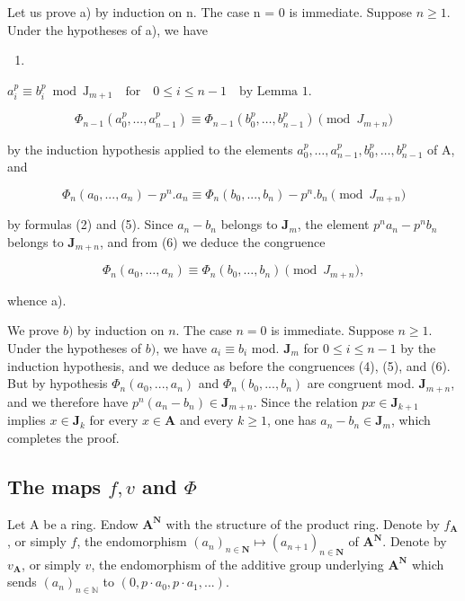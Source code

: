 Let us prove a) by induction on n. The case n = 0 is immediate. Suppose \(n \geqslant 1\). Under the hypotheses of a), we have

\begin{enumerate}
\def\labelenumi{(\arabic{enumi})}
\setcounter{enumi}{3}
\tightlist
\item
\end{enumerate}

\(a_{i}^{p}\equiv b_{i}^{p}\bmod \mathrm{J}_{m + 1}\quad \text{for}\quad 0\leqslant i\leqslant n - 1\quad \text{by Lemma } 1.\)

\[
\Phi_ {n - 1} (a _ {0} ^ {p}, \dots , a _ {n - 1} ^ {p}) \equiv \Phi_ {n - 1} (b _ {0} ^ {p}, \dots , b _ {n - 1} ^ {p}) \pmod{J _ {m + n}}\tag{5}
\]

by the induction hypothesis applied to the elements \(a_0^p, \ldots, a_{n-1}^p, b_0^p, \ldots, b_{n-1}^p\) of A, and

\[
\Phi_ {n} (a _ {0},..., a _ {n}) - p ^ {n}. a _ {n} \equiv \Phi_ {n} (b _ {0},..., b _ {n}) - p ^ {n}. b _ {n} \pmod{J _ {m + n}}\tag{6}
\]

by formulas (2) and (5). Since \(a_{n}-b_{n}\) belongs to \(\mathbf{J}_{m}\), the element \(p^{n}a_{n}-p^{n}b_{n}\) belongs to \(\mathbf{J}_{m+n}\), and from (6) we deduce the congruence

\[
\Phi_ {n} (a _ {0}, \dots , a _ {n}) \equiv \Phi_ {n} (b _ {0}, \dots , b _ {n}) \pmod{J _ {m + n}},
\]

whence a).

We prove \(b)\) by induction on \(n\). The case \(n=0\) is immediate. Suppose \(n\geqslant1\). Under the hypotheses of \(b)\), we have \(a_{i}\equiv b_{i}\) mod. \(\mathbf{J}_{m}\) for \(0\leqslant i\leqslant n-1\) by the induction hypothesis, and we deduce as before the congruences (4), (5), and (6). But by hypothesis \(\Phi_{n}(a_{0},...,a_{n})\) and \(\Phi_{n}(b_{0},...,b_{n})\) are congruent mod. \(\mathbf{J}_{m+n}\), and we therefore have \(p^{n}(a_{n}-b_{n})\in\mathbf{J}_{m+n}\). Since the relation \(p x\in\mathbf{J}_{k+1}\) implies \(x\in\mathbf{J}_{k}\) for every \(x\in\mathbf{A}\) and every \(k\geqslant1\), one has \(a_{n}-b_{n}\in\mathbf{J}_{m}\), which completes the proof.

\subsection{\texorpdfstring{The maps \(f, v\) and \(\Phi\)}{The maps f, v, and Φ}}

Let A be a ring. Endow \(\mathbf{A}^{\mathbf{N}}\) with the structure of the product ring. Denote by \(f_{\mathbf{A}}\), or simply \(f\), the endomorphism \((a_{n})_{n\in\mathbf{N}}\mapsto(a_{n+1})_{n\in\mathbf{N}}\) of \(\mathbf{A}^{\mathbf{N}}\). Denote by \(v_{\mathbf{A}}\), or simply \(v\), the endomorphism of the additive group underlying \(\mathbf{A}^{\mathbf{N}}\) which sends \((a_{n})_{n\in\mathbb{N}}\) to \((0,p\cdot a_{0},p\cdot a_{1},...)\).

